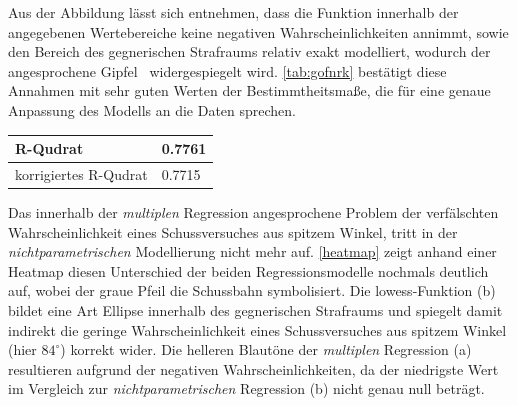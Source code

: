 Aus der Abbildung lässt sich entnehmen, dass die Funktion innerhalb der angegebenen Wertebereiche keine negativen Wahrscheinlichkeiten annimmt, sowie den Bereich des gegnerischen Strafraums relativ exakt modelliert, wodurch der angesprochene \glqq Gipfel\grqq~ widergespiegelt wird. \vref{tab:gofnrk} bestätigt diese Annahmen mit sehr guten Werten der Bestimmtheitsmaße, die für eine genaue Anpassung des Modells an die Daten sprechen.

\tablehead{}
\tabletail{}
\tablelasttail{}
\begin{center}%
\begin{supertabular}{ | P{6cm} | P{3cm}  |}
\textsf{R-Qudrat} 	& 0.7761	\\
\hline
\textsf{korrigiertes R-Qudrat} 	&  0.7715	\\
\hline
\end{supertabular}
\end{center}

Das innerhalb der \textit{multiplen} Regression angesprochene Problem der verfälschten Wahrscheinlichkeit eines Schussversuches aus spitzem Winkel, tritt in der \textit{nichtparametrischen} Modellierung nicht mehr auf. \vref{heatmap} zeigt anhand einer Heatmap diesen Unterschied der beiden Regressionsmodelle nochmals deutlich auf, wobei der graue Pfeil die Schussbahn symbolisiert. Die \gls{lowess}-Funktion (b) bildet eine Art Ellipse innerhalb des gegnerischen Strafraums und spiegelt damit indirekt die geringe Wahrscheinlichkeit eines Schussversuches aus spitzem Winkel (hier $84^\circ$) korrekt wider. Die helleren Blautöne der \textit{multiplen} Regression (a) resultieren aufgrund der negativen Wahrscheinlichkeiten, da der niedrigste Wert im Vergleich zur \textit{nichtparametrischen} Regression (b) nicht genau null beträgt.

